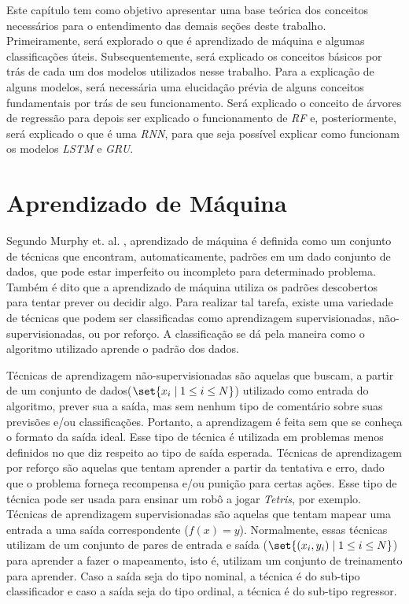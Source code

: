 Este capítulo tem como objetivo apresentar uma base teórica dos conceitos necessários para o entendimento das demais seções deste trabalho. Primeiramente, será explorado o que é aprendizado de máquina e algumas classificações úteis. Subsequentemente, será explicado os conceitos básicos por trás de cada um dos modelos utilizados nesse trabalho. Para a explicação de alguns modelos, será necessária uma elucidação prévia de alguns conceitos fundamentais por trás de seu funcionamento. Será explicado o conceito de árvores de regressão para depois ser explicado o funcionamento de \textit{\acrshort{RF}} e, posteriormente, será explicado o que é uma \textit{\acrshort{RNN}}, para que seja possível explicar como funcionam os modelos \textit{\acrshort{LSTM}} e \textit{\acrshort{GRU}}.

\section{Aprendizado de Máquina}

Segundo Murphy et. al. \cite{murphy2012machine}, aprendizado de máquina é definida como um conjunto de técnicas que encontram, automaticamente, padrões em um dado conjunto de dados, que pode estar imperfeito ou incompleto para determinado problema. Também é dito que a aprendizado de máquina utiliza os padrões descobertos para tentar prever ou decidir algo. Para realizar tal tarefa, existe uma variedade de técnicas que podem ser classificadas como aprendizagem supervisionadas, não-supervisionadas, ou por reforço. A classificação se dá pela maneira como o algoritmo utilizado aprende o padrão dos dados.

Técnicas de aprendizagem não-supervisionadas são aquelas que buscam, a partir de um conjunto de dados(\(\set{x_i \mid 1\leq i\leq N}\)) utilizado como entrada do algoritmo, prever sua a saída, mas sem nenhum tipo de comentário sobre suas previsões e/ou classificações. Portanto, a aprendizagem é feita sem que se conheça o formato da saída ideal. Esse tipo de técnica é utilizada em problemas menos definidos no que diz respeito ao tipo de saída esperada. Técnicas de aprendizagem por reforço são aquelas que tentam aprender a partir da tentativa e erro, dado que o problema forneça recompensa e/ou punição para certas ações. Esse tipo de técnica pode ser usada para ensinar um robô a jogar \textit{Tetris}, por exemplo. Técnicas de aprendizagem supervisionadas são aquelas que tentam mapear uma entrada a uma saída correspondente (\(f(x) = y\)). Normalmente, essas técnicas utilizam de um conjunto de pares de entrada e saída (\(\set{(x_i, y_i) \mid 1\leq i\leq N}\)) para aprender a fazer o mapeamento, isto é, utilizam um conjunto de treinamento para aprender. Caso a saída seja do tipo nominal, a técnica é do sub-tipo classificador e caso a saída seja do tipo ordinal, a técnica é do sub-tipo regressor.

